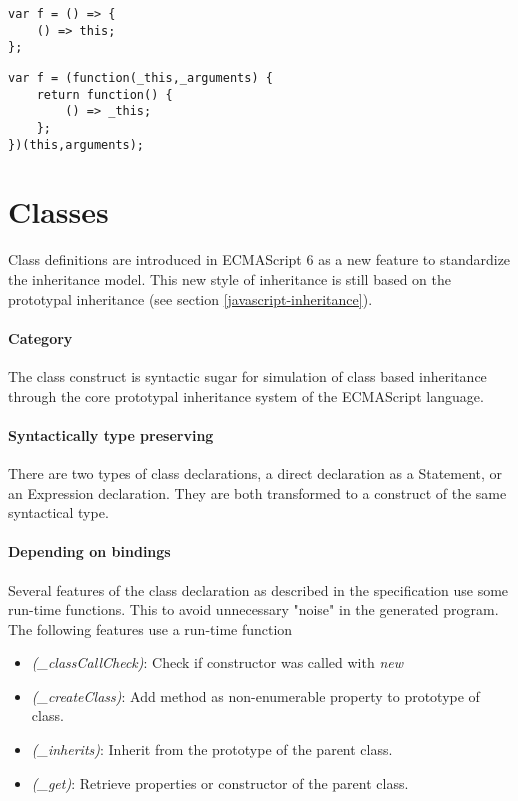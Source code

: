 \begin{lstlisting}
var f = () => {
	() => this;
};
\end{lstlisting}

\begin{lstlisting}[caption={Incorrect renaming of this in nested arrow function}]
var f = (function(_this,_arguments) {
	return function() {
		() => _this;
	};
})(this,arguments);
\end{lstlisting}

\section{Classes}
Class definitions\cite[14.5]{SpecJS} are introduced in ECMAScript 6 as a new feature to standardize the inheritance model.
This new style of inheritance is still based on the prototypal inheritance (see section \ref{javascript-inheritance}).

\paragraph{Category}
The class construct is syntactic sugar for simulation of class based inheritance through the core prototypal inheritance system of the ECMAScript language.

\paragraph{Syntactically type preserving}
There are two types of class declarations, a direct declaration as a Statement, or an Expression declaration. They are both transformed to a construct of the same syntactical type.

\paragraph{Depending on bindings}
Several features of the class declaration as described in the specification use some run-time functions. This to avoid unnecessary "noise" in the generated program. The following features use a run-time function

\begin{itemize}
	\item \textit{(\_classCallCheck)}: Check if constructor was called with \textit{new}
	\item \textit{(\_createClass)}: Add method as non-enumerable property to prototype of class.
	\item \textit{(\_inherits)}: Inherit from the prototype of the parent class.
	\item \textit{(\_get)}: Retrieve properties or constructor of the parent class.
\end{itemize}

